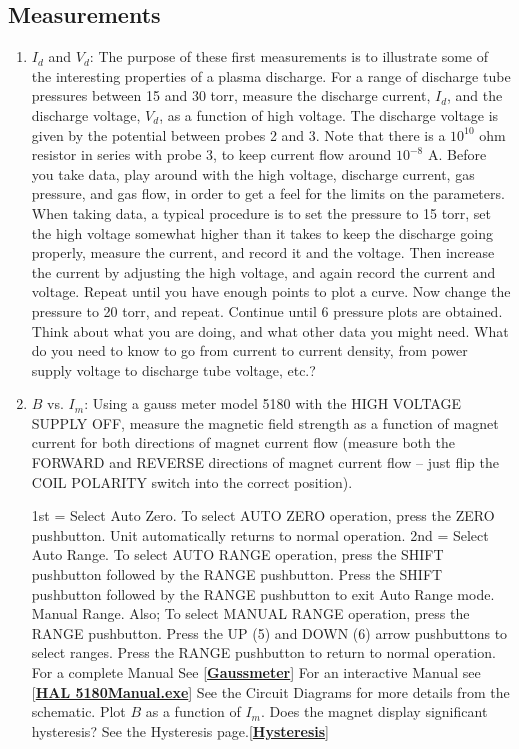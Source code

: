 \documentclass{../lab}
\begin{document}
\subsection{Measurements}

\newpage

\begin{enumerate}
    \item $I_d$ and $V_d$: The purpose of these first measurements is to illustrate some of the interesting properties of a plasma discharge. For a range of discharge tube pressures between 15 and 30 torr, measure the discharge current, $I_d$, and the discharge voltage, $V_d $, as a function of high voltage. The discharge voltage is given by the potential between probes 2 and 3. Note that there is a $10^{10}$ ohm resistor in series with probe 3, to keep current flow around $10^{-8}$ A. Before you take data, play around with the high voltage, discharge current, gas pressure, and gas flow, in order to get a feel for the limits on the parameters. When taking data, a typical procedure is to set the pressure to 15 torr, set the high voltage somewhat higher than it takes to keep the discharge going properly, measure the current, and record it and the voltage. Then increase the current by adjusting the high voltage, and again record the current and voltage. Repeat until you have enough points to plot a curve. Now change the pressure to 20 torr, and repeat. Continue until  6 pressure plots are obtained. Think about what you are doing, and what other data you might need. What do you need to know to go from current to current density, from power supply voltage to discharge tube voltage, etc.?

    \item $B$ vs. $I_m$: Using a gauss meter model 5180 with the HIGH VOLTAGE SUPPLY OFF, measure the magnetic field strength as a function of magnet current for both directions of magnet current flow (measure both the FORWARD and REVERSE directions of magnet current flow – just flip the COIL POLARITY switch into the correct position).

    1st = Select Auto Zero. To select AUTO ZERO operation, press the ZERO pushbutton. Unit automatically returns to normal operation. 2nd = Select Auto Range. To select AUTO RANGE operation, press the SHIFT pushbutton followed by the RANGE pushbutton. Press the SHIFT pushbutton followed by the RANGE pushbutton to exit Auto Range mode. Manual Range. Also; To select MANUAL RANGE operation, press the RANGE pushbutton. Press the UP (5) and DOWN (6) arrow pushbuttons to select ranges. Press the RANGE pushbutton to return to normal operation. For a complete Manual See [\href{http://physics111.lib.berkeley.edu/Physics111/Equipment\_Manuals/Gaussmeter5180.pdf}{\textbf{Gaussmeter}}] For an interactive Manual see [\href{http://physics111.lib.berkeley.edu/Physics111/Reprints/HAL/5180Manual.exe}{\textbf{HAL 5180Manual.exe}}] See the Circuit Diagrams for more details from the schematic. Plot $B$ as a function of $I_m$. Does the magnet display significant hysteresis? See the Hysteresis page.[\href{http://experimentationlab.berkeley.edu/Hysteresis}{\textbf{Hysteresis}}]


\end{enumerate}
\end{document}

